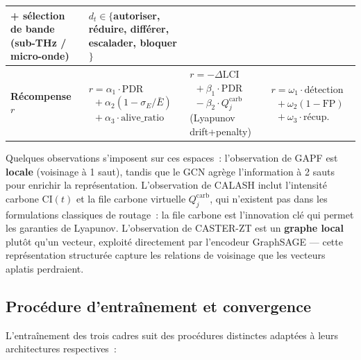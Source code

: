 \begin{table}[htbp]
{\begin{tabular}{p{1.7cm}p{3.8cm}p{3.8cm}p{3.8cm}}
  + sélection de bande\newline
  (sub-THz / micro-onde) &
  $d_t \in \{$autoriser,\newline
  \hphantom{$d_t \in \{$}réduire,\newline
  \hphantom{$d_t \in \{$}différer,\newline
  \hphantom{$d_t \in \{$}escalader,\newline
  \hphantom{$d_t \in \{$}bloquer$\}$ \\
\midrule
\textbf{Récompense $r$} &
  $r = \alpha_1 \cdot \text{PDR}$\newline
  $\phantom{r} + \alpha_2 (1 - \sigma_E/\bar{E})$\newline
  $\phantom{r} + \alpha_3 \cdot \text{alive\_ratio}$ &
  $r = -\Delta\text{LCI}$\newline
  $\phantom{r} + \beta_1 \cdot \text{PDR}$\newline
  $\phantom{r} - \beta_2 \cdot Q_j^{\text{carb}}$\newline
  (Lyapunov drift+penalty) &
  $r = \omega_1 \cdot \text{détection}$\newline
  $\phantom{r} + \omega_2 (1 - \text{FP})$\newline
  $\phantom{r} + \omega_3 \cdot \text{récup.}$ \\
\bottomrule
\end{tabular}%
}
\end{table}

Quelques observations s'imposent sur ces espaces~: l'observation de GAPF est \textbf{locale} (voisinage à 1 saut), tandis que le GCN agrège l'information à 2 sauts pour enrichir la représentation. L'observation de CALASH inclut l'intensité carbone $\text{CI}(t)$ et la file carbone virtuelle $Q_j^{\text{carb}}$, qui n'existent pas dans les formulations classiques de routage~: la file carbone est l'innovation clé qui permet les garanties de Lyapunov. L'observation de CASTER-ZT est un \textbf{graphe local} plutôt qu'un vecteur, exploité directement par l'encodeur GraphSAGE --- cette représentation structurée capture les relations de voisinage que les vecteurs aplatis perdraient.


\subsection{Procédure d'entraînement et convergence}

L'entraînement des trois cadres suit des procédures distinctes adaptées à leurs architectures respectives~:


